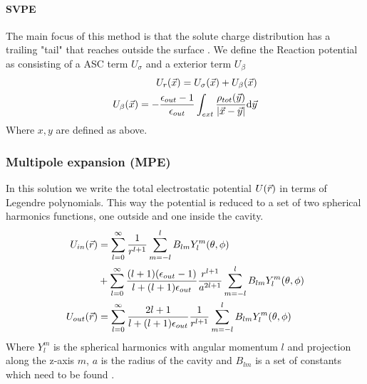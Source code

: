 \documentclass[../master_thesis.tex]{subfiles}
\begin{document}
\paragraph{\ac{SVPE}}
The main focus of this method is that the solute charge distribution has a trailing
"tail" that reaches outside the surface \cite{Tomasi:2005ipa}. We define the
Reaction potential as consisting of a \ac{ASC} term $U_{\sigma}$ and a exterior
term $U_{\beta}$
\begin{align}
  \begin{split}
    U_r(\vec{x}) = U_{\sigma}(\vec{x}) + U_{\beta}(\vec{x})\\
    U_{\beta}(\vec{x}) = -\frac{\epsilon_{out} - 1}{\epsilon_{out}}\int_{ext} \frac{\rho_{tot}(\vec{y})}{\abs{\vec{x} - \vec{y}}} \text{d}\vec{y}
  \end{split}
\end{align}
Where $x, y$ are defined as above.

\subsubsection{Multipole expansion (MPE)}
In this solution we write the total electrostatic potential $U(\vec{r})$ in terms
of Legendre polynomials. This way the potential is reduced to a set of two
spherical harmonics functions, one outside and one inside the cavity.
\begin{align}
  \begin{split}
    U_{in}(\vec{r}) &= \sum_{l=0}^{\infty}\frac{1}{r^{l+1}}\sum^l_{m=-l}B_{lm}Y^m_l(\theta, \phi) \\
    &+ \sum_{l=0}^{\infty}\frac{(l+1)(\epsilon_{out} - 1)}{l + (l+1)\epsilon_{out}} \frac{r^{l+1}}{a^{2l+1}}\sum^l_{m=-l}B_{lm}Y^m_l(\theta, \phi)\\
    U_{out}(\vec{r}) &=\sum_{l=0}^{\infty}\frac{2l+1}{l+(l+1)\epsilon_{out}}\frac{1}{r^{l+1}}\sum^l_{m=-l}B_{lm}Y^m_l(\theta, \phi)
  \end{split}
\end{align}
Where $Y^m_l$ is the spherical harmonics with angular momentum $l$ and projection
along the z-axis $m$, $a$ is the radius of the cavity and $B_{lm}$ is a set of
constants which need to be found \cite{Tomasi:1994wt}.
\end{document}
